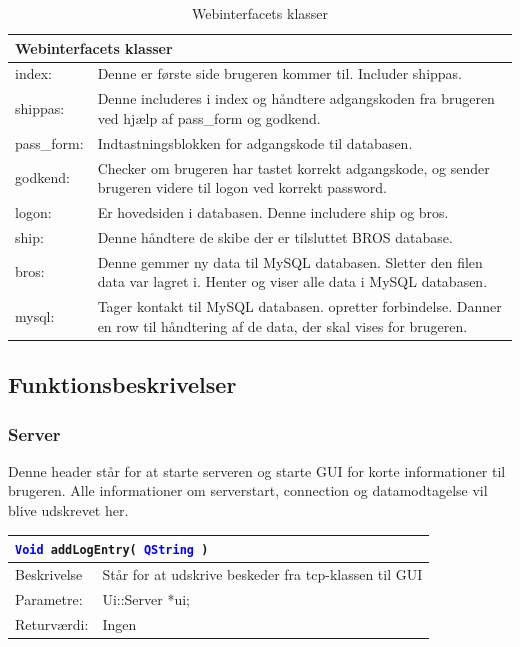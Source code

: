 \begin{table}[H]
\centering
{}
\begin{tabular}{| p{3cm}  p{12.5cm}|}
\multicolumn{2}{l}{{\Large Webinterfacets klasser}} \\\hline
index:& Denne er første side brugeren kommer til. Includer shippas.\\\hline
shippas:& Denne includeres i index og håndtere adgangskoden fra brugeren ved hjælp af pass\_form og godkend.\\\hline
pass\_form: & Indtastningsblokken for adgangskode til databasen.\\\hline
godkend:& Checker om brugeren har tastet korrekt adgangskode, og sender brugeren videre til logon ved korrekt password.\\\hline
logon:& Er hovedsiden i databasen. Denne includere ship og bros. \\\hline
ship:& Denne håndtere de skibe der er tilsluttet BROS database.\\\hline
bros:& Denne gemmer ny data til MySQL databasen. Sletter den filen data var lagret i. Henter og viser alle data i MySQL databasen.\\\hline
mysql:& Tager kontakt til MySQL databasen. opretter forbindelse. Danner en row til håndtering af de data, der skal vises for brugeren.\\\hline
\end{tabular}
\caption{Webinterfacets klasser}
\label{tabel:web-klasser}
\end{table}

\subsection{Funktionsbeskrivelser}
\subsubsection{Server}
Denne header står for at starte serveren og starte GUI for korte informationer til brugeren. Alle informationer om serverstart, connection og datamodtagelse vil blive udskrevet her. 

\begin{table}[H]
\begin{tabular}{l p{12.5cm}}
\multicolumn{2}{l}{\texttt{\textcolor{blue}{Void} addLogEntry( \textcolor{blue}{QString} )}} \\
\hline
Beskrivelse & Står for at udskrive beskeder fra tcp-klassen til GUI \\
Parametre: & Ui::Server *ui;\\
Returværdi:& Ingen\\
\end{tabular}
\end{table}

